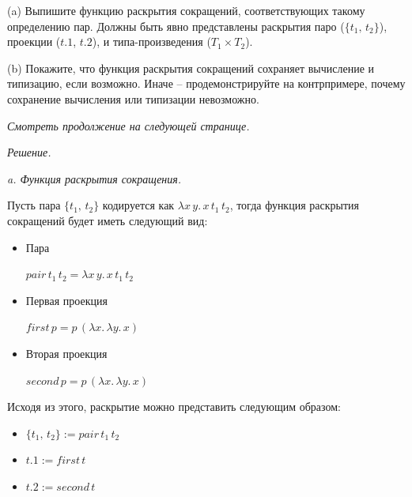 \documentclass[landscape, 11pt]{report}
\begin{document}
	\quad (a) Выпишите функцию раскрытия сокращений, соответствующих такому определению пар. Должны быть явно представлены раскрытия паро ($\{t_1, \, t_2\}$), проекции ($t.1$, $t.2$), и типа-произведения ($T_1 \times T_2$).
	
	\quad (b) Покажите, что функция раскрытия сокращений сохраняет вычисление и типизацию, если возможно. Иначе -- продемонстрируйте на контрпримере, почему сохранение вычисления или типизации невозможно.

	\vfill
	
	\footnotesize
	
	\begin{center}
		\textit{Смотреть продолжение на следующей странице.}
	\end{center}
	
	\normalsize

	\newpage

	\textit{Решение.}
	
	\vspace{0.2cm}

	\textit{a. Функция раскрытия сокращения.}
	
	\vspace{0.2cm}

	Пусть пара $\{t_1, \, t_2\}$ кодируется как $\lambda x \, y . \, x \, t_1 \, t_2$, тогда функция раскрытия сокращений будет иметь следующий вид:
	
	\begin{itemize}
		\item {Пара
			
			$pair \, t_1 \, t_2 = \lambda x \, y . \, x \, t_1 \, t_2$
		}
		
		\item {Первая проекция
			
			$first \, p = p \, (\lambda x . \, \lambda y . \, x) $
		}
		
		\item {Вторая проекция
			
			$second \, p = p \, (\lambda x . \, \lambda y . \, x)$
		}
	\end{itemize}
	
	Исходя из этого, раскрытие можно представить следующим образом:
	
	\begin{itemize}
		\item[] $\{t_1, \, t_2\} := pair \, t_1 \, t_2$
		\item[] $t.1 := first \, t$
		\item[] $t.2 := second \, t$
	\end{itemize}
	
\end{document}
